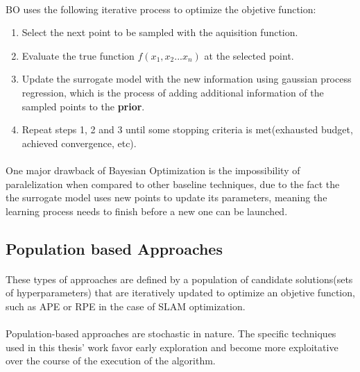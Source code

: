 \paragraph{}\ac{BO} uses the following iterative process to optimize the objetive function:
\begin{enumerate}
    \item Select the next point to be sampled with the aquisition function.
    \item Evaluate the true function $f(x_1, x_2 ... x_n)$ at the selected point.
    \item Update the surrogate model with the new information using gaussian process regression, which is the process of adding additional information of the sampled points to the \textbf{prior}.
    \item Repeat steps 1, 2 and 3 until some stopping criteria is met(exhausted budget, achieved convergence, etc).
\end{enumerate}

\paragraph{}One major drawback of Bayesian Optimization is the impossibility of paralelization when compared to other baseline techniques, due to the fact the the surrogate model uses new points to update its parameters, meaning the learning process needs to finish before a new one can be launched\cite{bissuel2020hyper}.

\subsection{Population based Approaches}
\paragraph{}These types of approaches are defined by a population of candidate solutions(sets of hyperparameters) that are iteratively updated to optimize an objetive function\cite{kostusiak2019efficiency}, such as APE or RPE in the case of SLAM optimization.
\paragraph{}Population-based approaches are stochastic in nature. The specific techniques used in this thesis' work favor early exploration and become more exploitative over the course of the execution of the algorithm.

